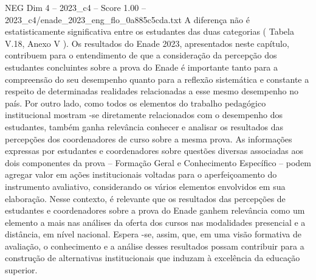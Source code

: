 \begin{textsample}{NEG Dim 4 – 2023\_c4 – Score 1.00 – 2023\_c4/enade\_2023\_eng\_flo\_0a885c5cda.txt}
A diferença não é estatisticamente significativa entre os estudantes das duas categorias ( Tabela V.18, Anexo V ).
Os resultados do Enade 2023, apresentados neste capítulo, contribuem para o entendimento de que a consideração da percepção dos estudantes concluintes sobre a prova do Enade é importante tanto para a compreensão do seu desempenho quanto para a reflexão sistemática e constante a respeito de determinadas realidades relacionadas a esse mesmo desempenho no país.
Por outro lado, como todos os elementos do trabalho pedagógico institucional mostram -se diretamente relacionados com o desempenho dos estudantes, também ganha relevância conhecer e analisar os resultados das percepções dos coordenadores de curso sobre a mesma prova.
As informações expressas por estudantes e coordenadores sobre questões diversas associadas aos dois componentes da prova – Formação Geral e Conhecimento Específico – podem agregar valor em ações institucionais voltadas para o aperfeiçoamento do instrumento avaliativo, considerando os vários elementos envolvidos em sua elaboração.
Nesse contexto, é relevante que os resultados das percepções de estudantes e coordenadores sobre a prova do Enade ganhem relevância como um elemento a mais nas análises da oferta dos cursos nas modalidades presencial e a distância, em nível nacional.
Espera -se, assim, que, em uma visão formativa de avaliação, o conhecimento e a análise desses resultados possam contribuir para a construção de alternativas institucionais que induzam à excelência da educação superior.

\end{textsample}
